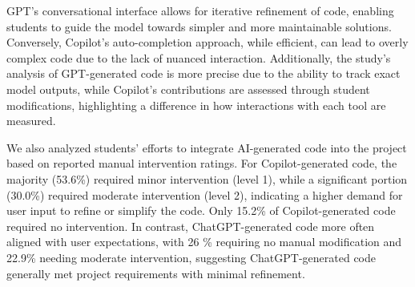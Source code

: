 GPT's conversational interface allows for iterative refinement of code, enabling students to guide the model towards simpler and more maintainable solutions. Conversely, Copilot's auto-completion approach, while efficient, can lead to overly complex code due to the lack of nuanced interaction. Additionally, the study's analysis of GPT-generated code is more precise due to the ability to track exact model outputs, while Copilot's contributions are assessed through student modifications, highlighting a difference in how interactions with each tool are measured.

We also analyzed students' efforts to integrate AI-generated code into the project based on reported manual intervention ratings. For Copilot-generated code, the majority (53.6\%) required minor intervention (level 1), while a significant portion (30.0\%) required moderate intervention (level 2), indicating a higher demand for user input to refine or simplify the code. Only 15.2\% of Copilot-generated code required no intervention. In contrast, ChatGPT-generated code more often aligned with user expectations, with 26 \% requiring no manual modification and 22.9\% needing moderate intervention, suggesting ChatGPT-generated code generally met project requirements with minimal refinement.


